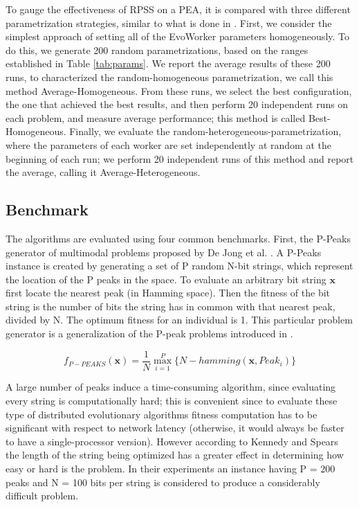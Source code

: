 \documentclass{sig-alternate}
\begin{document}
To gauge the effectiveness of RPSS on a PEA, it is compared with three different parametrization strategies, similar to what is done in \cite{fuku1,fuku2}.
First, we consider the simplest approach of setting all of the EvoWorker parameters homogeneously.
To do this, we generate 200 random parametrizations, based on the ranges established in Table \ref{tab:params}.
We report the average results of these 200 runs, to characterized the random-homogeneous parametrization, we call this method Average-Homogeneous.
From these runs, we select the best configuration, the one that achieved the best results,
and then perform 20 independent runs on each problem, and measure average performance; this method is called Best-Homogeneous.
Finally, we evaluate the random-heterogeneous-parametrization, where the parameters of each worker are set independently at random at
the beginning of each run; we perform 20 independent runs of this method and report the average, calling it Average-Heterogeneous.


\subsection{Benchmark}
\label{ss:benchmark}
The algorithms are evaluated using four common benchmarks.
First, the P-Peaks generator of multimodal problems proposed by De Jong et al. \cite{Jong:PS97}.
A P-Peaks instance is created by generating a set of P random N-bit
strings, which represent the location of the P peaks in the space. To
evaluate an arbitrary bit string \begin{math} \mathbf{x} \end{math}
first locate the nearest peak (in Hamming space). Then the fitness of
the bit string is the number of bits the string has in common with
that nearest peak, divided by N. The optimum fitness for an individual
is 1. This particular problem generator is a generalization of the
P-peak problems introduced in \cite{Jong:1990}.            

\begin{equation}
f_{P-PEAKS}(\mathbf{x})=\frac{1}{N} \overset{P}{\max_{i=1}} \{N-hamming(\mathbf{x},Peak_i)   \}
\end{equation}

A large number of peaks induce a time-consuming algorithm,
since evaluating every string is computationally hard; this is
convenient since to evaluate these type of distributed evolutionary
algorithms fitness computation has to be significant with respect to
network latency (otherwise, it would always be faster to have a
single-processor version). However
according to Kennedy and Spears \cite{Kennedy:1998ch} the length of
the string being optimized has a greater effect in determining how
easy or hard is the problem. In their experiments an instance having P
= 200 peaks and N = 100 bits per string is considered to produce a
considerably difficult problem.
\end{document}

